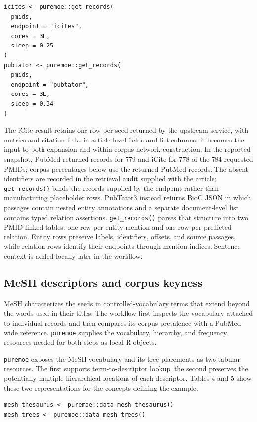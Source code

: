 \begin{verbatim}
icites <- puremoe::get_records(
  pmids,
  endpoint = "icites",
  cores = 3L,
  sleep = 0.25
)
pubtator <- puremoe::get_records(
  pmids,
  endpoint = "pubtator",
  cores = 3L,
  sleep = 0.34
)
\end{verbatim}

The iCite result retains one row per seed returned by the upstream service,
with metrics and citation links in article-level fields and list-columns; it
becomes the input to both expansion and within-corpus network construction. In
the reported snapshot, PubMed returned records for
779 and iCite for
778 of the 784 requested PMIDs; corpus
percentages below use the returned PubMed records. The absent identifiers are
recorded in the retrieval audit supplied with the article; \texttt{get\_records()} binds the
records supplied by the endpoint rather than manufacturing placeholder rows.
PubTator3 instead returns BioC JSON in
which passages contain nested entity annotations and a separate document-level
list contains typed relation assertions. \texttt{get\_records()} parses that structure
into two PMID-linked tables: one row per entity mention and one row per predicted
relation. Entity rows preserve labels, identifiers, offsets, and source
passages, while relation rows identify their endpoints through mention indices.
Sentence context is added locally later in the workflow.

\subsection{MeSH descriptors and corpus keyness}\label{mesh-descriptors-and-corpus-keyness}

MeSH characterizes the seeds in controlled-vocabulary terms that extend beyond
the words used in their titles. The workflow first inspects the vocabulary
attached to individual records and then compares its corpus prevalence with a
PubMed-wide reference. \texttt{puremoe} supplies the vocabulary, hierarchy, and
frequency resources needed for both steps as local R objects.

\texttt{puremoe} exposes the MeSH vocabulary and its tree placements as two tabular
resources. The first supports term-to-descriptor lookup; the second preserves
the potentially multiple hierarchical locations of each descriptor. Tables 4
and 5 show these two representations for the concepts defining the example.

\begin{verbatim}
mesh_thesaurus <- puremoe::data_mesh_thesaurus()
mesh_trees <- puremoe::data_mesh_trees()
\end{verbatim}

